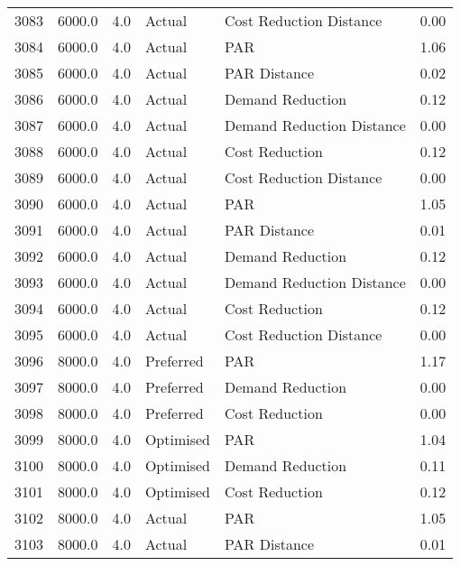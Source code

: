 \begin{longtable}{lrrllr}
3083 &       6000.0 &     4.0 &         Actual &    Cost Reduction Distance &   0.00 \\
3084 &       6000.0 &     4.0 &         Actual &                        PAR &   1.06 \\
3085 &       6000.0 &     4.0 &         Actual &               PAR Distance &   0.02 \\
3086 &       6000.0 &     4.0 &         Actual &           Demand Reduction &   0.12 \\
3087 &       6000.0 &     4.0 &         Actual &  Demand Reduction Distance &   0.00 \\
3088 &       6000.0 &     4.0 &         Actual &             Cost Reduction &   0.12 \\
3089 &       6000.0 &     4.0 &         Actual &    Cost Reduction Distance &   0.00 \\
3090 &       6000.0 &     4.0 &         Actual &                        PAR &   1.05 \\
3091 &       6000.0 &     4.0 &         Actual &               PAR Distance &   0.01 \\
3092 &       6000.0 &     4.0 &         Actual &           Demand Reduction &   0.12 \\
3093 &       6000.0 &     4.0 &         Actual &  Demand Reduction Distance &   0.00 \\
3094 &       6000.0 &     4.0 &         Actual &             Cost Reduction &   0.12 \\
3095 &       6000.0 &     4.0 &         Actual &    Cost Reduction Distance &   0.00 \\
3096 &       8000.0 &     4.0 &      Preferred &                        PAR &   1.17 \\
3097 &       8000.0 &     4.0 &      Preferred &           Demand Reduction &   0.00 \\
3098 &       8000.0 &     4.0 &      Preferred &             Cost Reduction &   0.00 \\
3099 &       8000.0 &     4.0 &      Optimised &                        PAR &   1.04 \\
3100 &       8000.0 &     4.0 &      Optimised &           Demand Reduction &   0.11 \\
3101 &       8000.0 &     4.0 &      Optimised &             Cost Reduction &   0.12 \\
3102 &       8000.0 &     4.0 &         Actual &                        PAR &   1.05 \\
3103 &       8000.0 &     4.0 &         Actual &               PAR Distance &   0.01 \\

\end{longtable}
